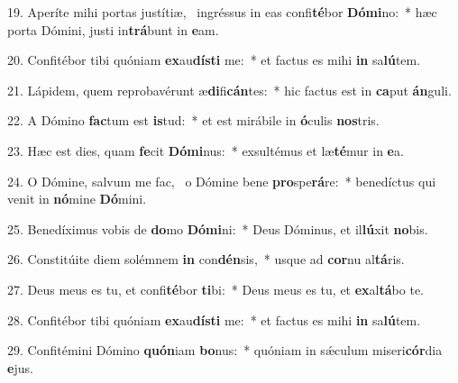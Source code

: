 19. Aperíte mihi portas justítiæ, \dag\  ingréssus in eas confi\textbf{té}bor \textbf{Dó}\textbf{mi}no:~*  hæc porta Dómini, justi in\textbf{trá}bunt in \textbf{e}am.\

20. Confitébor tibi quóniam \textbf{ex}au\textbf{dís}\textbf{ti} me:~*  et factus es mihi \textbf{in} sa\textbf{lú}tem.\

21. Lápidem, quem reprobavérunt æ\textbf{di}fi\textbf{cán}tes:~*  hic factus est in \textbf{ca}put \textbf{án}guli.\

22. A Dómino \textbf{fac}tum est \textbf{is}tud:~*  et est mirábile in \textbf{ó}culis \textbf{nos}tris.\

23. Hæc est dies, quam \textbf{fe}cit \textbf{Dó}\textbf{mi}nus:~*  exsultémus et læ\textbf{té}mur in \textbf{e}a.\

24. O Dómine, salvum me fac, \dag\  o Dómine bene \textbf{pro}spe\textbf{rá}re:~*  benedíctus qui venit in \textbf{nó}mine \textbf{Dó}mini.\

25. Benedíximus vobis de \textbf{do}mo \textbf{Dó}\textbf{mi}ni:~*  Deus Dóminus, et il\textbf{lú}xit \textbf{no}bis.\

26. Constitúite diem solémnem \textbf{in} con\textbf{dén}sis,~*  usque ad \textbf{cor}nu al\textbf{tá}ris.\

27. Deus meus es tu, et confi\textbf{té}bor \textbf{ti}bi:~*  Deus meus es tu, et \textbf{ex}al\textbf{tá}bo te.\

28. Confitébor tibi quóniam \textbf{ex}au\textbf{dís}\textbf{ti} me:~*  et factus es mihi \textbf{in} sa\textbf{lú}tem.\

29. Confitémini Dómino \textbf{quón}iam \textbf{bo}nus:~*  quóniam in sǽculum miseri\textbf{cór}dia \textbf{e}jus.\

